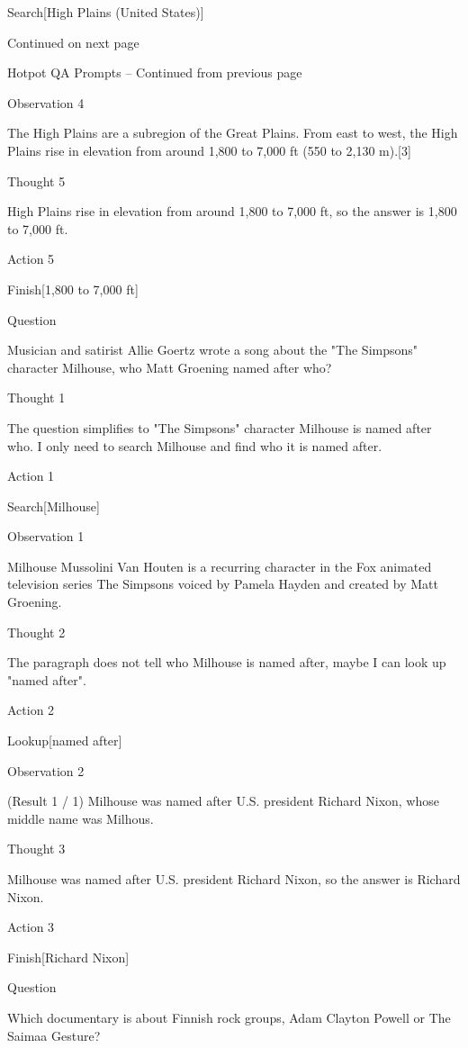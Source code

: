 \documentclass[
]{article}
\begin{document}
Search{[}High Plains (United States){]}

Continued on next page

Hotpot QA Prompts -- Continued from previous page

Observation 4

The High Plains are a subregion of the Great Plains. From east to west,
the High Plains rise in elevation from around 1,800 to 7,000 ft (550 to
2,130 m).{[}3{]}

Thought 5

High Plains rise in elevation from around 1,800 to 7,000 ft, so the
answer is 1,800 to 7,000 ft.

Action 5

Finish{[}1,800 to 7,000 ft{]}

Question

Musician and satirist Allie Goertz wrote a song about the "The Simpsons"
character Milhouse, who Matt Groening named after who?

Thought 1

The question simplifies to "The Simpsons" character Milhouse is named
after who. I only need to search Milhouse and find who it is named
after.

Action 1

Search{[}Milhouse{]}

Observation 1

Milhouse Mussolini Van Houten is a recurring character in the Fox
animated television series The Simpsons voiced by Pamela Hayden and
created by Matt Groening.

Thought 2

The paragraph does not tell who Milhouse is named after, maybe I can
look up "named after".

Action 2

Lookup{[}named after{]}

Observation 2

(Result 1 / 1) Milhouse was named after U.S. president Richard Nixon,
whose middle name was Milhous.

Thought 3

Milhouse was named after U.S. president Richard Nixon, so the answer is
Richard Nixon.

Action 3

Finish{[}Richard Nixon{]}

Question

Which documentary is about Finnish rock groups, Adam Clayton Powell or
The Saimaa Gesture?
\end{document}
